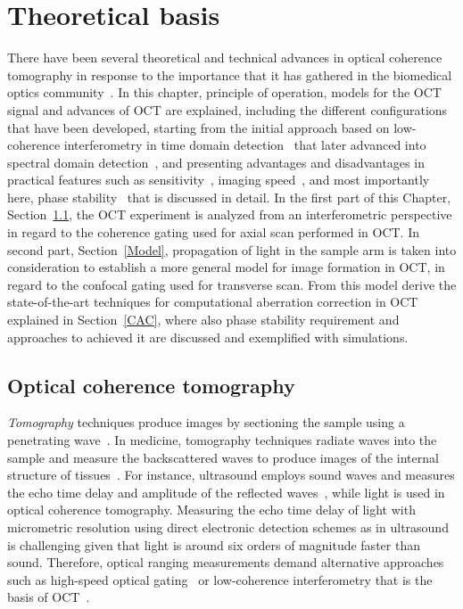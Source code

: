 \newpage
{}
\chapter{Theoretical basis}\label{chap:theory}

There have been several theoretical and technical advances in optical coherence tomography in response to the importance that it has gathered in the biomedical optics community~\cite{Fujimoto2015_Introduction}. In this chapter, principle of operation, models for the OCT signal and advances of OCT are explained, including the different configurations that have been developed, starting from the initial approach based on low-coherence interferometry in time domain detection~\cite{Huang1991_Optical} that later advanced into spectral domain detection~\cite{Fercher1995_Measurement, Chinn1997_Optical}, and presenting advantages and disadvantages in practical features such as sensitivity~\cite{deBoer2003_Improved}, imaging speed~\cite{Yun2003_Highspeed}, and most importantly here, phase stability~\cite{White2003_vivo} that is discussed in detail. In the first part of this Chapter, Section~\ref{OCT}, the OCT experiment is analyzed from an interferometric perspective in regard to the coherence gating used for axial scan performed in OCT. In second part, Section~\ref{Model}, propagation of light in the sample arm is taken into consideration to establish a more general model for image formation in OCT, in regard to the confocal gating used for transverse scan. From this model derive the state-of-the-art techniques for computational aberration correction in OCT explained in Section~\ref{CAC}, where also phase stability requirement and approaches to achieved it are discussed and exemplified with simulations.

\section{Optical coherence tomography}\label{OCT}

\textit{Tomography} techniques produce images by sectioning the sample using a penetrating wave~\cite{Guy2005_Introduction}. In medicine, tomography techniques radiate waves into the sample and measure the backscattered waves to produce images of the internal structure of tissues~\cite{Guy2005_Introduction}. For instance, ultrasound employs sound waves and measures the echo time delay and amplitude of the reflected waves~\cite{Szabo2014_Diagnostic}, while light is used in optical coherence tomography. Measuring the echo time delay of light with micrometric resolution using direct electronic detection schemes as in ultrasound is challenging given that light is around six orders of magnitude faster than sound. Therefore, optical ranging measurements demand alternative approaches such as high-speed optical gating~\cite{Duguay1971_Ultrahigh} or low-coherence interferometry that is the basis of OCT~\cite{Huang1991_Optical}.


